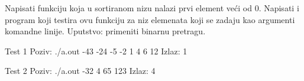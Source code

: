 \begin{Answer}[ref=406]
\end{Answer}
\begin{Exercise}[label=407]
  Napisati funkciju koja u sortiranom nizu nalazi prvi element veći od
  0. Napisati i program koji
  testira ovu funkciju za niz elemenata koji se zadaju kao argumenti
  komandne linije. Uputstvo: primeniti binarnu pretragu.
  
\begin{miditest}
\begin{test}{Test 1}
Poziv:  ./a.out -43 -24 -5 -2 1 4 6 12
Izlaz:  1
\end{test}
\end{miditest}

\begin{miditest}
\begin{test}{Test 2}
Poziv:  ./a.out -32 4 65 123
Izlaz:  4
\end{test}
\end{miditest}
  
\end{Exercise}

